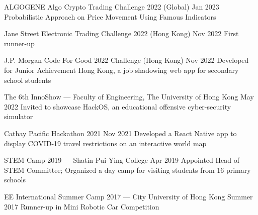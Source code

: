 \jobTitle
{ALGOGENE Algo Crypto Trading Challenge 2022 (Global)}
{Jan 2023}
{Probabilistic Approach on Price Movement Using Famous Indicators}

\jobTitle
{Jane Street Electronic Trading Challenge 2022 (Hong Kong)}
{Nov 2022}
{First runner-up}

\jobTitle
{J.P. Morgan Code For Good 2022 Challenge (Hong Kong)}
{Nov 2022}
{Developed for Junior Achievement Hong Kong, a job shadowing web app for secondary school students}

\jobTitle
{The 6th InnoShow --- Faculty of Engineering, The University of Hong Kong}
{May 2022}
{Invited to showcase HackOS, an educational offensive cyber-security simulator}

\jobTitle
{Cathay Pacific Hackathon 2021}
{Nov 2021}
{Developed a React Native app to display COVID-19 travel restrictions on an interactive world map}

\jobTitle
{STEM Camp 2019 --- Shatin Pui Ying College}
{Apr 2019}
{Appointed Head of STEM Committee; Organized a day camp for visiting students from 16 primary schools}

\jobTitle
{EE International Summer Camp 2017 --- City University of Hong Kong}
{Summer 2017}
{Runner-up in Mini Robotic Car Competition}
